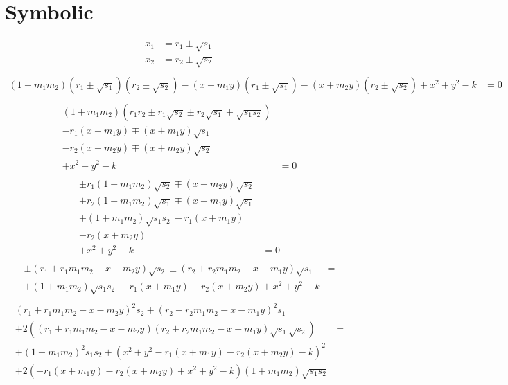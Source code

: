 \documentclass{article}
\begin{document}
\section{Symbolic}
\begin{align*}
  x_1 &= r_1 \pm \sqrt{s_1}\\
  x_2 &= r_2 \pm \sqrt{s_2}\\
\end{align*}
\begin{align*}
  (1 + m_1 m_2) (r_1 \pm \sqrt{s_1}) (r_2 \pm \sqrt{s_2}) - (x + m_1 y) (r_1 \pm \sqrt{s_1}) - (x + m_2 y) (r_2 \pm \sqrt{s_2}) + x^2 + y^2 - k &= 0\\
\end{align*}
\begin{align*}
  (1 + m_1 m_2) (r_1 r_2 \pm r_1 \sqrt{s_2} \pm r_2 \sqrt{s_1} + \sqrt{s_1 s_2})\\
  - r_1 (x + m_1 y) \mp (x + m_1 y)\sqrt{s_1}\\
  - r_2 (x + m_2 y) \mp (x + m_2 y)\sqrt{s_2}\\
  + x^2 + y^2 - k &= 0\\
\end{align*}
\begin{align*}
  \pm r_1 (1 + m_1 m_2) \sqrt{s_2}
  \mp (x + m_2 y)\sqrt{s_2}\\
  \pm r_2 (1 + m_1 m_2) \sqrt{s_1}
  \mp (x + m_1 y)\sqrt{s_1}\\
  + (1 + m_1 m_2) \sqrt{s_1 s_2}
  - r_1 (x + m_1 y) \\
  - r_2 (x + m_2 y) \\
  + x^2 + y^2 - k &= 0\\
\end{align*}
\begin{align*}
  \pm (r_1 + r_1 m_1 m_2 - x - m_2 y) \sqrt{s_2} \pm (r_2 + r_2 m_1 m_2 - x - m_1 y) \sqrt{s_1} &=\\
  + (1 + m_1 m_2) \sqrt{s_1 s_2} - r_1 (x + m_1 y) - r_2 (x + m_2 y) + x^2 + y^2 - k\\
\end{align*}
\begin{align*}
  (r_1 + r_1 m_1 m_2 - x - m_2 y)^2 s_2 +  (r_2 + r_2 m_1 m_2 - x - m_1 y)^2 s_1\\
  + 2 ((r_1 + r_1 m_1 m_2 - x - m_2 y) (r_2 + r_2 m_1 m_2 - x - m_1 y) \sqrt{s_1} \sqrt{s_2}) &= \\
  + (1 + m_1 m_2)^2 s_1 s_2 + (x^2 + y^2 - r_1 (x + m_1 y) - r_2 (x + m_2 y) - k)^2\\
  + 2 (- r_1 (x + m_1 y) - r_2 (x + m_2 y) + x^2 + y^2 - k) (1 + m_1 m_2) \sqrt{s_1 s_2}\\
\end{align*}
\end{document}
